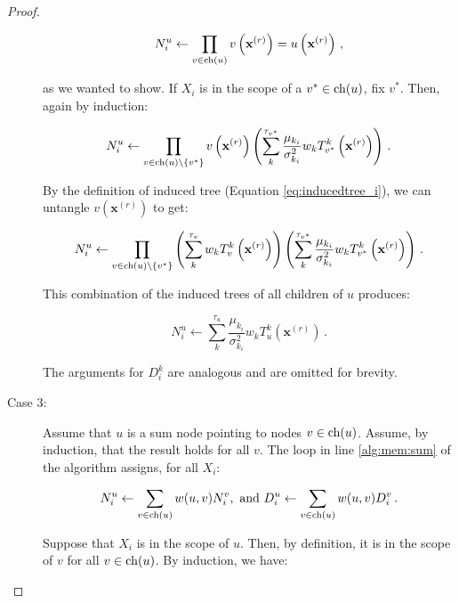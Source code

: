 \begin{proof}
\begin{description}
      \begin{equation}
        N^u_i \gets \prod_{v \in \operatorname*{ch}(u)} v\left(\mathbf{x}^{(r)}\right) = u\left(\mathbf{x}^{(r)}\right)\, ,
      \end{equation}

      as we wanted to show. If $X_i$ is in the scope of a $v^* \in \operatorname*{ch}(u)$, fix $v^*$. Then, again by induction:

      \begin{equation}
        N^u_i \gets \prod_{v \in \operatorname*{ch}(u) \setminus \{v^*\}} v\left(\mathbf{x}^{(r)}\right) \left( \sum_k^{\tau_{v^*}} \frac{\mu_{k_i}}{\sigma_{k_i}^2} w_k T_{v^*}^k\left(\mathbf{x}^{(r)}\right) \right) \, .
      \end{equation}

      By the definition of induced tree (Equation \ref{eq:inducedtree_i}), we can untangle $v(\mathbf{x}^{(r)})$ to get:

      \begin{equation}
        N^u_i \gets \prod_{v \in \operatorname*{ch}(u) \setminus \{v^*\}} \left( \sum_k^{\tau_{v}} w_k T_v^k\left(\mathbf{x}^{(r)}\right) \right) \left( \sum_k^{\tau_{v^*}} \frac{\mu_{k_i}}{\sigma_{k_i}^2} w_k T_{v^*}^k\left(\mathbf{x}^{(r)}\right) \right) \, .
      \end{equation}

      This combination of the induced trees of all children of $u$ produces:

      \begin{equation}
        N^u_i \gets \sum_k^{\tau_u} \frac{\mu_{k_i}}{\sigma_{k_i}^2} w_k T_u^k\left(\mathbf{x}^{(r)}\right) \, .
      \end{equation}

      The arguments for $D^k_i$ are analogous and are omitted for brevity.

    \item[Case 3:] Assume that $u$ is a sum node pointing to nodes $v \in \operatorname*{ch}(u)$. Assume, by induction, that the result holds for all $v$. The loop in line \ref{alg:mem:sum} of the algorithm assigns, for all $X_i$:

      \begin{equation}
        N^u_i \gets \sum_{v \in \operatorname*{ch}(u)} w(u, v) N^v_i, \text{ and }
        D^u_i \gets \sum_{v \in \operatorname*{ch}(u)} w(u, v) D^v_i \, .
      \end{equation}

      Suppose that $X_i$ is in the scope of $u$. Then, by definition, it is in the scope of $v$ for all $v \in \operatorname*{ch}(u)$. By induction, we have:


\end{description}
\end{proof}
